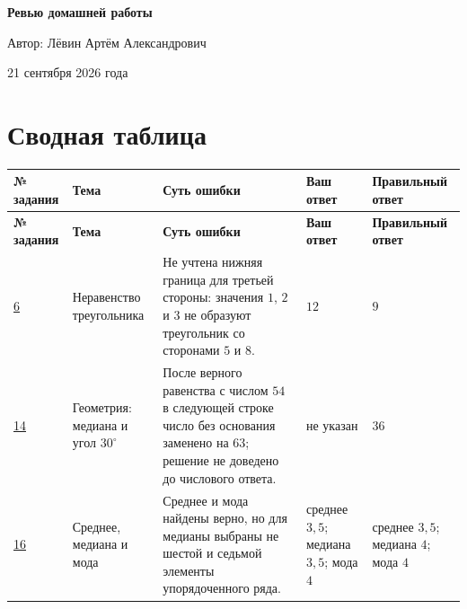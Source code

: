\documentclass[12pt,a4paper]{article}
\begin{document}
\begin{titlepage}
\centering
\vspace*{0.22\textheight}

{\Huge\bfseries Ревью домашней работы\par}

\vspace{2.2cm}

{\Large Автор: Лёвин Артём Александрович\par}

\vspace{0.8cm}

{\large 21 сентября 2026 года\par}

\vfill


\end{titlepage}

\newpage

\section*{Сводная таблица}

\small
\begin{longtable}{@{}p{1.2cm}p{2.4cm}p{5.0cm}p{3.3cm}p{3.3cm}@{}}
\toprule
\textbf{№ задания} & \textbf{Тема} & \textbf{Суть ошибки} & \textbf{Ваш ответ} & \textbf{Правильный ответ} \\
\midrule
\endfirsthead
\toprule
\textbf{№ задания} & \textbf{Тема} & \textbf{Суть ошибки} & \textbf{Ваш ответ} & \textbf{Правильный ответ} \\
\midrule
\endhead

\hyperref[task:6]{6} &
Неравенство треугольника &
Не учтена нижняя граница для третьей стороны: значения $1$, $2$ и $3$ не образуют треугольник со сторонами $5$ и $8$. &
$12$ &
$9$ \\

\addlinespace

\hyperref[task:14]{14} &
Геометрия: медиана и угол $30^\circ$ &
После верного равенства с числом $54$ в следующей строке число без основания заменено на $63$; решение не доведено до числового ответа. &
не указан &
$36$ \\

\addlinespace

\hyperref[task:16]{16} &
Среднее, медиана и мода &
Среднее и мода найдены верно, но для медианы выбраны не шестой и седьмой элементы упорядоченного ряда. &
среднее $3{,}5$; медиана $3{,}5$; мода $4$ &
среднее $3{,}5$; медиана $4$; мода $4$ \\

\bottomrule
\end{longtable}
\normalsize
\end{document}
